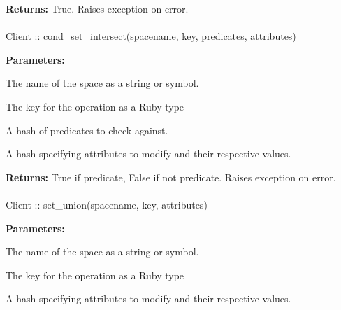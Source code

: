 \noindent\textbf{Returns:}
True.  Raises exception on error.

\paragraph{}
\label{api:ruby:cond_set_intersect}
\begin{rubycode}
Client :: cond_set_intersect(spacename, key, predicates, attributes)
\end{rubycode}


\noindent\textbf{Parameters:}
\begin{description}[labelindent=\widthof{{\code{predicates}}},leftmargin=*,noitemsep,nolistsep,align=right]
\item[\code{spacename}] The name of the space as a string or symbol.
\item[\code{key}] The key for the operation as a Ruby type
\item[\code{predicates}] A hash of predicates to check against.
\item[\code{attributes}] A hash specifying attributes to modify and their respective values.
\end{description}

\noindent\textbf{Returns:}
True if predicate, False if not predicate.  Raises exception on error.

\paragraph{}
\label{api:ruby:set_union}
\begin{rubycode}
Client :: set_union(spacename, key, attributes)
\end{rubycode}


\noindent\textbf{Parameters:}
\begin{description}[labelindent=\widthof{{\code{attributes}}},leftmargin=*,noitemsep,nolistsep,align=right]
\item[\code{spacename}] The name of the space as a string or symbol.
\item[\code{key}] The key for the operation as a Ruby type
\item[\code{attributes}] A hash specifying attributes to modify and their respective values.
\end{description}

